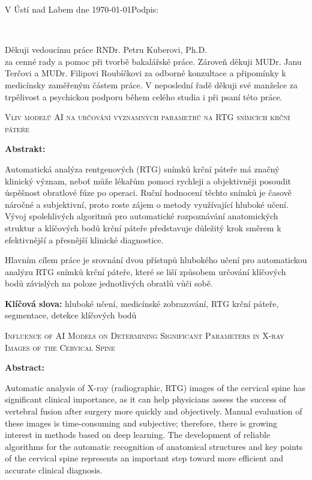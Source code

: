 \documentclass[male,czech,api_bc]{kitheses}
\newcommand{\nazevcz}{Vliv modelů AI na určování významných parametrů na RTG snímcích krční páteře}
\newcommand{\nazeven}{Influence of AI Models on Determining Significant Parameters in X-ray Images of the Cervical Spine}
\newcommand{\vedouciDAT}{RNDr. Petru Kuberovi, Ph.D.}
\begin{document}
\vspace{2em}

V Ústí nad Labem dne \today \hfill Podpis: \makebox[4cm][s]{\dotfill}

\cleardoublepage
\thispagestyle{empty}
~
\vfill

\begin{flushright}
    Děkuji vedoucímu práce \vedouciDAT\\
    za cenné rady a pomoc při tvorbě bakalářské práce. Zároveň děkuji MUDr. Janu Terčovi a MUDr. Filipovi Roubíčkovi za odborné konzultace a připomínky k medicínsky zaměřeným částem práce. V neposlední řadě děkuji své manželce za trpělivost a psychickou podporu během celého studia i při psaní této práce.
\end{flushright}

\cleardoublepage

\textsc{\nazevcz}

\textbf{Abstrakt:}

Automatická analýza rentgenových (RTG) snímků krční páteře má značný klinický význam, neboť může lékařům pomoci rychleji a objektivněji posoudit úspěšnost obratlové fúze po operaci. Ruční hodnocení těchto snímků je časově náročné a subjektivní, proto roste zájem o metody využívající hluboké učení. Vývoj spolehlivých algoritmů pro automatické rozpoznávání anatomických struktur a klíčových bodů krční páteře představuje důležitý krok směrem k efektivnější a přesnější klinické diagnostice.

Hlavním cílem práce je srovnání dvou přístupů hlubokého učení pro automatickou analýzu RTG snímků krční páteře, které se liší způsobem určování klíčových bodů závislých na poloze jednotlivých obratlů vůči sobě.

\textbf{Klíčová slova:} hluboké učení, medicínské zobrazování, RTG krční páteře, segmentace, detekce klíčových bodů

\bigskip

\textsc{\nazeven}

\textbf{Abstract:}

Automatic analysis of X-ray (radiographic, RTG) images of the cervical spine has significant clinical importance, as it can help physicians assess the success of vertebral fusion after surgery more quickly and objectively. Manual evaluation of these images is time-consuming and subjective; therefore, there is growing interest in methods based on deep learning. The development of reliable algorithms for the automatic recognition of anatomical structures and key points of the cervical spine represents an important step toward more efficient and accurate clinical diagnosis.
\end{document}
